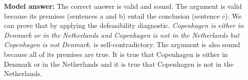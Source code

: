 \documentclass[a4,11pt]{article}
\begin{document}
\begin{enumerate}[leftmargin = 12pt]
 {\bf Model answer:} The correct answer is valid and sound. The argument is valid because its premises (sentences a and b) entail the conclusion (sentence c). We can prove that by applying the defeasibility diagnostic. {\em Copenhagen is either in Denmark or in the Netherlands and Copenhagen is not in the Netherlands but Copenhagen is not Denmark.} is self-contradictory. The argument is also sound because all of its premises are true. It is true that Copenhagen is either in Denmark or in the Netherlands and it is true that Copenhagen is not in the Netherlands. 
 


\end{enumerate}
\end{document}
